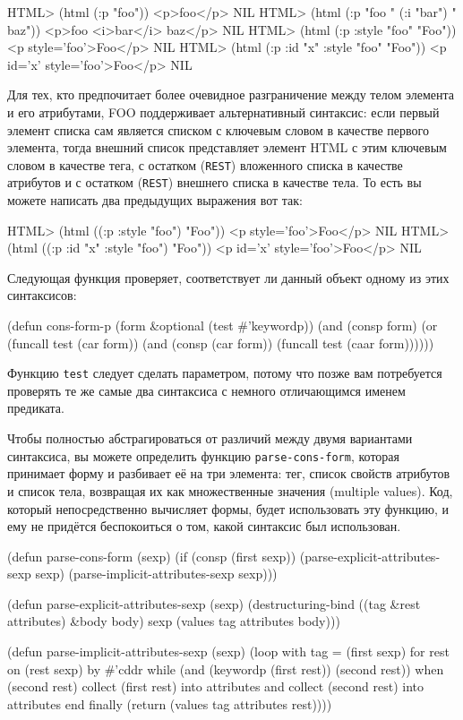 \begin{myverb}
HTML> (html (:p "foo"))
<p>foo</p>
NIL
HTML> (html (:p "foo " (:i "bar") " baz"))
<p>foo <i>bar</i> baz</p>
NIL
HTML> (html (:p :style "foo" "Foo"))
<p style='foo'>Foo</p>
NIL
HTML> (html (:p :id "x" :style "foo" "Foo"))
<p id='x' style='foo'>Foo</p>
NIL
\end{myverb}

Для тех, кто предпочитает более очевидное разграничение между телом элемента и его
атрибутами, FOO поддерживает альтернативный синтаксис: если первый элемент списка сам
является списком с ключевым словом в качестве первого элемента, тогда внешний список
представляет элемент HTML с этим ключевым словом в качестве тега, с остатком (\lstinline{REST})
вложенного списка в качестве атрибутов и с остатком (\lstinline{REST}) внешнего списка в
качестве тела. То есть вы можете написать два предыдущих выражения вот так:

\begin{myverb}
HTML> (html ((:p :style "foo") "Foo"))
<p style='foo'>Foo</p>
NIL
HTML> (html ((:p :id "x" :style "foo") "Foo"))
<p id='x' style='foo'>Foo</p>
NIL
\end{myverb}

Следующая функция проверяет, соответствует ли данный объект одному из этих синтаксисов:

\begin{myverb}
(defun cons-form-p (form &optional (test #'keywordp))
  (and (consp form)
       (or (funcall test (car form))
           (and (consp (car form)) (funcall test (caar form))))))
\end{myverb}

Функцию \lstinline{test} следует сделать параметром, потому что позже вам потребуется проверять
те же самые два синтаксиса с немного отличающимся именем предиката.

Чтобы полностью абстрагироваться от различий между двумя вариантами синтаксиса, вы можете
определить функцию \lstinline{parse-cons-form}, которая принимает форму и разбивает её на три
элемента: тег, список свойств атрибутов и список тела, возвращая их как множественные
значения (multiple values). Код, который непосредственно вычисляет формы, будет
использовать эту функцию, и ему не придётся беспокоиться о том, какой синтаксис был
использован.

\begin{myverb}
(defun parse-cons-form (sexp)
  (if (consp (first sexp))
    (parse-explicit-attributes-sexp sexp)
    (parse-implicit-attributes-sexp sexp)))

(defun parse-explicit-attributes-sexp (sexp)
  (destructuring-bind ((tag &rest attributes) &body body) sexp
    (values tag attributes body)))

(defun parse-implicit-attributes-sexp (sexp)
  (loop with tag = (first sexp)
     for rest on (rest sexp) by #'cddr
     while (and (keywordp (first rest)) (second rest))
     when (second rest)
       collect (first rest) into attributes and
       collect (second rest) into attributes
     end
     finally (return (values tag attributes rest))))
\end{myverb}

